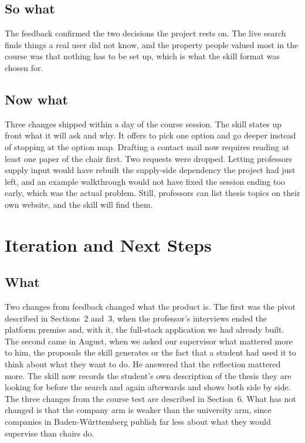 \documentclass[11pt,a4paper]{article}
\begin{document}
\subsection*{So what}

\noindent The feedback confirmed the two decisions the project rests on. The
live search finds things a real user did not know,  and the property people valued most
in the course was that nothing has to be set up, which is what the skill format
was chosen for.

\subsection*{Now what}

\noindent Three changes shipped within a day of the course session. The skill
states up front what it will ask and why. It offers to pick one option and go
deeper instead of stopping at the option map. Drafting a contact mail now
requires reading at least one paper of the chair first. Two requests were
dropped. Letting professors supply input would have rebuilt the supply-side
dependency the project had just left, and an example walkthrough would not
have fixed the session ending too early, which was the actual problem. Still, professors can list thesis topics on their own website, and the skill will find them.

\section{Iteration and Next Steps}

\subsection*{What}

\noindent Two changes from feedback changed what the product is. The
first was the pivot described in Sections~2 and~3, when the professor's interviews
ended the platform premise and, with it, the full-stack application we had already
built. The second came in August, when we asked our supervisor what mattered more
to him, the proposals the skill generates or the fact that a student had used it
to think about what they want to do. He answered that the reflection mattered
more. The skill now records the student's own description of the thesis they are
looking for before the search and again afterwards and shows both side by side.
The three changes from the course test are described in Section~6. What has
not changed is that the company arm is weaker than the university arm, since
companies in Baden-W\"urttemberg publish far less about what they would
supervise than chairs do.
\end{document}
